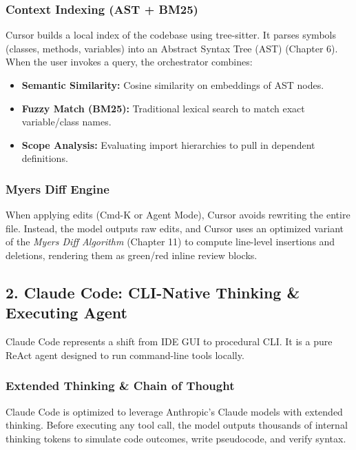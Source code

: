 \subsubsection{Context Indexing (AST + BM25)}
Cursor builds a local index of the codebase using tree-sitter. It parses symbols (classes, methods, variables) into an Abstract Syntax Tree (AST) (Chapter 6). When the user invokes a query, the orchestrator combines:
\begin{itemize}
    \item \textbf{Semantic Similarity:} Cosine similarity on embeddings of AST nodes.
    \item \textbf{Fuzzy Match (BM25):} Traditional lexical search to match exact variable/class names.
    \item \textbf{Scope Analysis:} Evaluating import hierarchies to pull in dependent definitions.
\end{itemize}

\subsubsection{Myers Diff Engine}
When applying edits (Cmd-K or Agent Mode), Cursor avoids rewriting the entire file. Instead, the model outputs raw edits, and Cursor uses an optimized variant of the \textit{Myers Diff Algorithm} (Chapter 11) to compute line-level insertions and deletions, rendering them as green/red inline review blocks.

\subsection{2. Claude Code: CLI-Native Thinking \& Executing Agent}

Claude Code represents a shift from IDE GUI to procedural CLI. It is a pure ReAct agent designed to run command-line tools locally.

\subsubsection{Extended Thinking \& Chain of Thought}
Claude Code is optimized to leverage Anthropic's Claude models with extended thinking. Before executing any tool call, the model outputs thousands of internal thinking tokens to simulate code outcomes, write pseudocode, and verify syntax.

